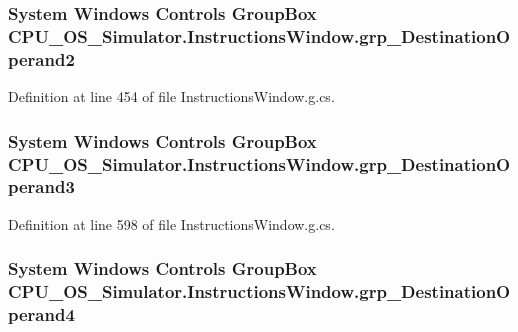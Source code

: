 \subsubsection[{grp\+\_\+\+Destination\+Operand2}]{\setlength{\rightskip}{0pt plus 5cm}System Windows Controls Group\+Box C\+P\+U\+\_\+\+O\+S\+\_\+\+Simulator.\+Instructions\+Window.\+grp\+\_\+\+Destination\+Operand2\hspace{0.3cm}{\ttfamily [package]}}\label{class_c_p_u___o_s___simulator_1_1_instructions_window_adc32bbf0f47985507d606abb4862072f}


Definition at line 454 of file Instructions\+Window.\+g.\+cs.

\hypertarget{class_c_p_u___o_s___simulator_1_1_instructions_window_a175eb53a0a0f48be4d8717f1e5a5942e}{}
\subsubsection[{grp\+\_\+\+Destination\+Operand3}]{\setlength{\rightskip}{0pt plus 5cm}System Windows Controls Group\+Box C\+P\+U\+\_\+\+O\+S\+\_\+\+Simulator.\+Instructions\+Window.\+grp\+\_\+\+Destination\+Operand3\hspace{0.3cm}{\ttfamily [package]}}\label{class_c_p_u___o_s___simulator_1_1_instructions_window_a175eb53a0a0f48be4d8717f1e5a5942e}


Definition at line 598 of file Instructions\+Window.\+g.\+cs.

\hypertarget{class_c_p_u___o_s___simulator_1_1_instructions_window_a68c2f892a54f7826baacf9c828431fa8}{}
\subsubsection[{grp\+\_\+\+Destination\+Operand4}]{\setlength{\rightskip}{0pt plus 5cm}System Windows Controls Group\+Box C\+P\+U\+\_\+\+O\+S\+\_\+\+Simulator.\+Instructions\+Window.\+grp\+\_\+\+Destination\+Operand4\hspace{0.3cm}{\ttfamily [package]}}\label{class_c_p_u___o_s___simulator_1_1_instructions_window_a68c2f892a54f7826baacf9c828431fa8}


